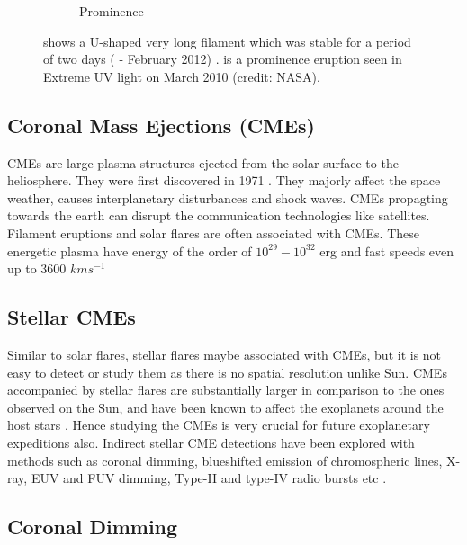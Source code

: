 \begin{figure}
\begin{subfigure}[b]{0.5\textwidth}
         \caption{Prominence}
         \label{fig:prominence}
     \end{subfigure}
     \label{fig:filament_prominence}
     \caption[Filament and Prominence]{ shows a U-shaped very long filament which was stable for a period of two days ( -  February 2012) .  is a prominence eruption seen in Extreme UV light on  March 2010 (credit: NASA).}
\end{figure}

\subsection{Coronal Mass Ejections (CMEs)}

CMEs are large plasma structures ejected from the solar surface to the heliosphere. They were first discovered in 1971 \citep{Gopalswamy2016-nm}. They majorly affect the space weather, causes interplanetary disturbances and shock waves. CMEs propagting towards the earth can disrupt the communication technologies like satellites. Filament eruptions and solar flares are often associated with CMEs. These energetic plasma have energy of the order of $10^{29} - 10^{32}$ erg and fast speeds even up to 3600 $kms^{-1}$

\subsection{Stellar CMEs}

Similar to solar flares, stellar flares maybe associated with CMEs, but it is not easy to detect or study them as there is no spatial resolution unlike Sun. CMEs accompanied by stellar flares are substantially larger in comparison to the ones observed on the Sun, and have been known to affect the exoplanets around the host stars \citep{Veronig2021-rf}. Hence studying the CMEs is very crucial for future exoplanetary expeditions also. Indirect stellar CME detections have been explored with methods such as coronal dimming, blueshifted emission of chromospheric lines, X-ray, EUV and FUV dimming, Type-II and type-IV radio bursts etc \citep{Korhonen2016-jo}.

\subsection{Coronal Dimming}

